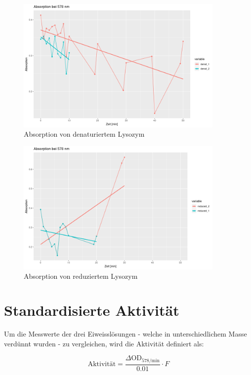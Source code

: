 \documentclass[a4paper,german]{scrreprt}
\begin{document}
\begin{figure}[h]
	\centering
	\includegraphics[width=0.9\textwidth]{data/absorption_denat}
	\caption{Absorption von denaturiertem Lysozym}
	\label{fig:absorption_denat}
\end{figure}

\begin{figure}[h]
	\centering
	\includegraphics[width=0.9\textwidth]{data/absorption_reduced}
	\caption{Absorption von reduziertem Lysozym}
	\label{fig:absorption_reduced}
\end{figure}

\section{Standardisierte Aktivität}

Um die Messwerte der drei Eiweisslösungen - welche in unterschiedlichem Masse
verdünnt wurden - zu vergleichen, wird die Aktivität definiert als:

\[
	\text{Aktivität} = \frac{\Delta \text{OD}_{578 / \text{min}}}{0.01} \cdot F
\] 
\end{document}

